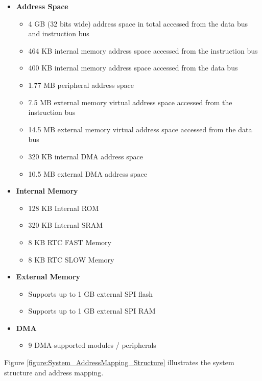 \documentclass[main\_\_EN.tex]{subfiles}
\begin{document}
\begin{itemize}
    \item {\bfseries Address Space}
        \begin{itemize}
            \item 4 GB (32 bits wide) address space in total accessed from the data bus and instruction bus
    	    \item 464 KB internal memory address space accessed from the instruction bus
    	    \item 400 KB internal memory address space accessed from the data bus
    	    \item 1.77 MB peripheral address space
    	    \item 7.5 MB external memory virtual address space accessed from the instruction bus
    	    \item 14.5 MB external memory virtual address space accessed from the data bus
    	    \item 320 KB internal DMA address space
    	    \item 10.5 MB external DMA address space
        \end{itemize}
    \item {\bfseries Internal Memory}
        \begin{itemize}
            \item 128 KB Internal ROM
	        \item 320 KB Internal SRAM
	        \item 8 KB RTC FAST Memory
	        \item 8 KB RTC SLOW Memory
	    \end{itemize}
    \item {\bfseries External Memory}
        \begin{itemize}
            \item Supports up to 1 GB external SPI flash
	        \item Supports up to 1 GB external SPI RAM
	    \end{itemize}
    \item {\bfseries DMA}
        \begin{itemize}
            \item 9 DMA-supported modules / peripherals
        \end{itemize}
\end{itemize}

Figure \ref{figure:System_AddressMapping_Structure} illustrates the system structure and address mapping.
\end{document}
